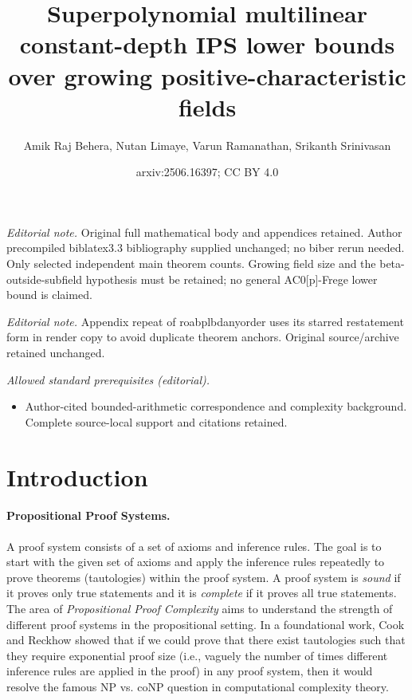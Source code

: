 \documentclass[11pt]{article}
\title{Superpolynomial multilinear constant-depth IPS lower bounds over growing positive-characteristic fields}
\author{Amik Raj Behera, Nutan Limaye, Varun Ramanathan, Srikanth Srinivasan}
\date{arxiv:2506.16397; CC BY 4.0}
\begin{document}
\maketitle
\noindent\textit{Editorial note.} Original full mathematical body and appendices retained. Author precompiled biblatex3.3 bibliography supplied unchanged; no biber rerun needed. Only selected independent main theorem counts. Growing field size and the beta-outside-subfield hypothesis must be retained; no general AC0[p]-Frege lower bound is claimed.\par\medskip
\noindent\textit{Editorial note.} Appendix repeat of roabplbdanyorder uses its starred restatement form in render copy to avoid duplicate theorem anchors. Original source/archive retained unchanged.\par\medskip
\noindent\textit{Allowed standard prerequisites (editorial).}\begin{itemize}
\item Author-cited bounded-arithmetic correspondence and complexity background. Complete source-local support and citations retained.
\end{itemize}\medskip
\section{Introduction}
\label{sec:intro}
\paragraph{Propositional Proof Systems.} A proof system consists of a set of axioms and inference rules. The goal is to start with the given set of axioms and apply the inference rules repeatedly to prove theorems (tautologies) within the proof system.  A proof system is \emph{sound} if it proves only true statements and it is \emph{complete} if it proves all true statements. The area of \emph{Propositional Proof Complexity} aims to understand the strength of different proof systems in the propositional setting. In a foundational work, Cook and Reckhow \cite{CR79} showed that if we could prove that there exist tautologies such that they require exponential proof size (i.e., vaguely the number of times different inference rules are applied in the proof) in any proof system, then it would resolve the famous NP vs. coNP question in computational complexity theory. 

\end{document}
